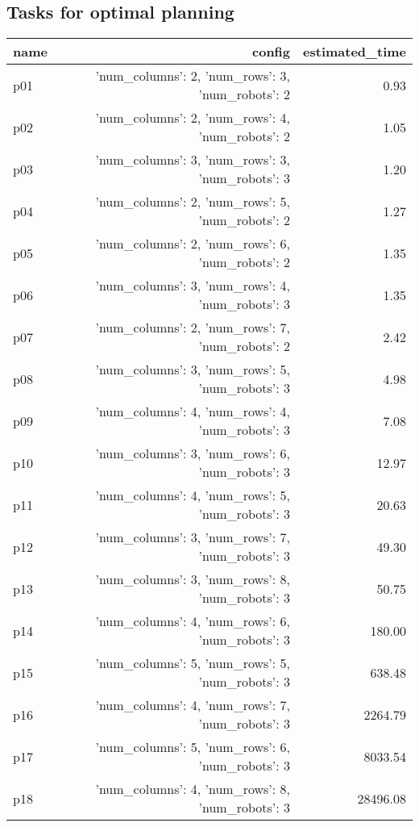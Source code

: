 \documentclass{article}
\begin{document}
                                \subsection*{Tasks for optimal planning}
                                
                            \begin{center}
                            \scriptsize
                            \begin{tabular}{@{}l|r|r@{}}
                            name & config & estimated\_time\\\midrule
                              p01&{'num\_columns': 2, 'num\_rows': 3, 'num\_robots': 2}&0.93\\
  p02&{'num\_columns': 2, 'num\_rows': 4, 'num\_robots': 2}&1.05\\
  p03&{'num\_columns': 3, 'num\_rows': 3, 'num\_robots': 3}&1.20\\
  p04&{'num\_columns': 2, 'num\_rows': 5, 'num\_robots': 2}&1.27\\
  p05&{'num\_columns': 2, 'num\_rows': 6, 'num\_robots': 2}&1.35\\
  p06&{'num\_columns': 3, 'num\_rows': 4, 'num\_robots': 3}&1.35\\
  p07&{'num\_columns': 2, 'num\_rows': 7, 'num\_robots': 2}&2.42\\
  p08&{'num\_columns': 3, 'num\_rows': 5, 'num\_robots': 3}&4.98\\
  p09&{'num\_columns': 4, 'num\_rows': 4, 'num\_robots': 3}&7.08\\
  p10&{'num\_columns': 3, 'num\_rows': 6, 'num\_robots': 3}&12.97\\
  p11&{'num\_columns': 4, 'num\_rows': 5, 'num\_robots': 3}&20.63\\
  p12&{'num\_columns': 3, 'num\_rows': 7, 'num\_robots': 3}&49.30\\
  p13&{'num\_columns': 3, 'num\_rows': 8, 'num\_robots': 3}&50.75\\
  p14&{'num\_columns': 4, 'num\_rows': 6, 'num\_robots': 3}&180.00\\
  p15&{'num\_columns': 5, 'num\_rows': 5, 'num\_robots': 3}&638.48\\
  p16&{'num\_columns': 4, 'num\_rows': 7, 'num\_robots': 3}&2264.79\\
  p17&{'num\_columns': 5, 'num\_rows': 6, 'num\_robots': 3}&8033.54\\
  p18&{'num\_columns': 4, 'num\_rows': 8, 'num\_robots': 3}&28496.08\\

\end{tabular}
\end{center}
\end{document}
